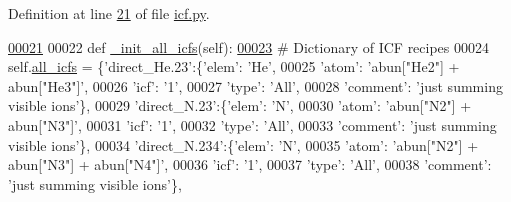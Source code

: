 Definition at line \hyperlink{icf_8py_source_l00021}{21} of file \hyperlink{icf_8py_source}{icf.\-py}.


\begin{DoxyCode}
\hypertarget{classpyneb_1_1core_1_1icf_1_1_i_c_f_l00021}{}\hyperlink{classpyneb_1_1core_1_1icf_1_1_i_c_f_a876a93732ddd09b3551fd7a426b317d3}{00021} 
00022     \textcolor{keyword}{def }\hyperlink{classpyneb_1_1core_1_1icf_1_1_i_c_f_a876a93732ddd09b3551fd7a426b317d3}{\_init\_all\_icfs}(self):
\hypertarget{classpyneb_1_1core_1_1icf_1_1_i_c_f_l00023}{}\hyperlink{classpyneb_1_1core_1_1icf_1_1_i_c_f_a854ee87a53feb102e429e902227ce88b}{00023}         \textcolor{comment}{# Dictionary of ICF recipes}
00024         self.\hyperlink{classpyneb_1_1core_1_1icf_1_1_i_c_f_a854ee87a53feb102e429e902227ce88b}{all\_icfs} = \{\textcolor{stringliteral}{'direct\_He.23'}:\{\textcolor{stringliteral}{'elem'}: \textcolor{stringliteral}{'He'},
00025                                        \textcolor{stringliteral}{'atom'}: \textcolor{stringliteral}{'abun["He2"] + abun["He3"]'},
00026                                        \textcolor{stringliteral}{'icf'}: \textcolor{stringliteral}{'1'},
00027                                        \textcolor{stringliteral}{'type'}: \textcolor{stringliteral}{'All'},
00028                                        \textcolor{stringliteral}{'comment'}: \textcolor{stringliteral}{'just summing visible ions'}\},
00029                          \textcolor{stringliteral}{'direct\_N.23'}:\{\textcolor{stringliteral}{'elem'}: \textcolor{stringliteral}{'N'},
00030                                        \textcolor{stringliteral}{'atom'}: \textcolor{stringliteral}{'abun["N2"] + abun["N3"]'},
00031                                        \textcolor{stringliteral}{'icf'}: \textcolor{stringliteral}{'1'},
00032                                        \textcolor{stringliteral}{'type'}: \textcolor{stringliteral}{'All'},
00033                                        \textcolor{stringliteral}{'comment'}: \textcolor{stringliteral}{'just summing visible ions'}\},
00034                          \textcolor{stringliteral}{'direct\_N.234'}:\{\textcolor{stringliteral}{'elem'}: \textcolor{stringliteral}{'N'},
00035                                        \textcolor{stringliteral}{'atom'}: \textcolor{stringliteral}{'abun["N2"] + abun["N3"] + abun["N4"]'},
00036                                        \textcolor{stringliteral}{'icf'}: \textcolor{stringliteral}{'1'},
00037                                        \textcolor{stringliteral}{'type'}: \textcolor{stringliteral}{'All'},
00038                                        \textcolor{stringliteral}{'comment'}: \textcolor{stringliteral}{'just summing visible ions'}\},

\end{DoxyCode}
